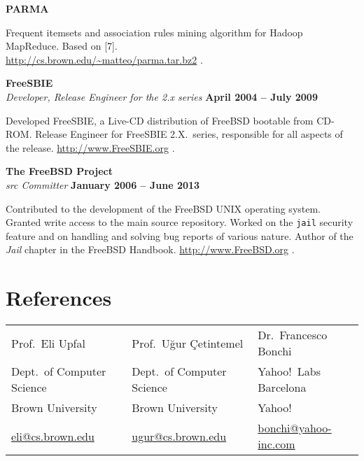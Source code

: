 \documentclass[margin,line]{resume}
\begin{document}
{\bf PARMA}
\begin{list2}
  \vspace*{.05in}
\item Frequent itemsets and association rules mining algorithm for Hadoop MapReduce.
  Based on [7]. \\\url{http://cs.brown.edu/~matteo/parma.tar.bz2} .
\end{list2}

{\bf FreeSBIE }\\
{\em Developer, Release Engineer for the 2.x series} \hfill{\bf April 2004 --
July 2009}

\begin{list2}
\vspace*{.05in}
\item Developed FreeSBIE, a Live-CD distribution of FreeBSD bootable from CD-ROM.
Release Engineer for FreeSBIE 2.X.~series, responsible for all aspects of
the release. \url{http://www.FreeSBIE.org} .
\end{list2}

{\bf The FreeBSD Project}\\
{\em \textrm{src} Committer} \hfill {\bf January 2006 -- June 2013}

\begin{list2}
\vspace*{.05in}
\item Contributed to the development of the FreeBSD UNIX operating system.
  Granted write access to the main source repository. Worked on the
  \texttt{jail} security feature and on handling and solving bug reports of
  various nature. Author of the \emph{Jail} chapter in the FreeBSD Handbook.
  \url{http://www.FreeBSD.org} .
\end{list2}

\section {\sc References}
\begin{table}[h!]
  \centering
  \begin{tabular}{lll}
    Prof.~Eli Upfal & Prof.~U\u{g}ur \c{C}etintemel & Dr.~Francesco Bonchi \\
    Dept.~of Computer Science & Dept.~of Computer Science & Yahoo!~Labs Barcelona
    \\
    Brown University & Brown University & Yahoo! \\
    \url{eli@cs.brown.edu} & \url{ugur@cs.brown.edu} &
    \url{bonchi@yahoo-inc.com} \\
  \end{tabular}
\end{table}
\end{document}
